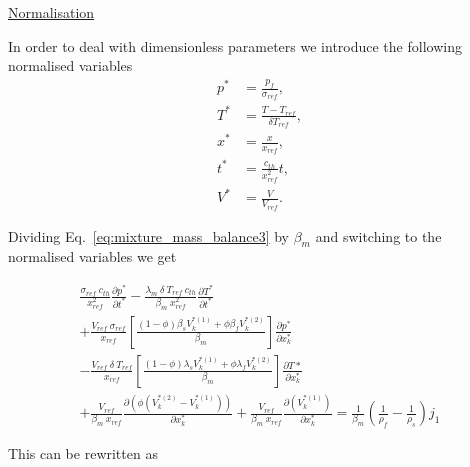 \documentclass[]{scrreprt}
\begin{document}
\underline{Normalisation}

In order to deal with dimensionless parameters we introduce the following normalised variables
\begin{subequations}
  \label{eq:def_normalisations}
  \begin{align}
  p^* &= \frac{p_f}{\sigma_{ref}}, \\   
  T^* &= \frac{T-T_{ref}}{\delta T_{ref}}, \\   
  x^* &= \frac{x}{x_{ref}}, \\   
  t^* &= \frac{c_{th}}{x^2_{ref}}t, \\   
  V^* &= \frac{V}{V_{ref}}.
  \end{align}
\end{subequations}

Dividing Eq.~\ref{eq:mixture_mass_balance3} by $\beta_m$ and switching to the normalised variables we get

\begin{multline}
  \label{eq:mixture_mass_balance4}
  \frac{\sigma_{ref} \: c_{th}}{x^2_{ref}} \frac{\partial p^*}{\partial t^*} 
  - \frac{\lambda_m \: \delta \: T_{ref} \: c_{th}}{\beta_m\:x^2_{ref}} \frac{\partial T^*}{\partial t^*} \\
  + \frac{V_{ref} \: \sigma_{ref}}{x_{ref}}\left[\frac{(1-\phi)\beta_s V^{*(1)}_k + \phi\beta_f V^{*(2)}_k}{\beta_m} \right] \frac{\partial p^*}{\partial x^*_k} \\
  - \frac{V_{ref}\:\delta\:T_{ref}}{x_{ref}}\left[\frac{(1-\phi)\lambda_s V^{*(1)}_k + \phi\lambda_f V^{*(2)}_k}{\beta_m} \right] \frac{\partial T*}{\partial x^*_k} \\
  + \frac{V_{ref}}{\beta_m\:x_{ref}} \frac{\partial( \phi (V^{*(2)}_k -V^{*(1)}_k))}{\partial x^*_k}
  + \frac{V_{ref}}{\beta_m\:x_{ref}} \frac{\partial(V^{*(1)}_k)}{\partial x^*_k}  
  = \frac{1}{\beta_m} \left(\frac{1}{\rho_f} - \frac{1}{\rho_s}\right)j_1
\end{multline}

This can be rewritten as
\end{document}
